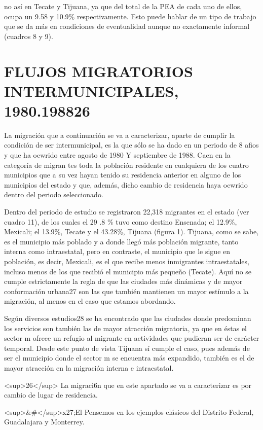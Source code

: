 \documentclass{article}
\begin{document}
no así en Tecate y Tijuana, ya que del total de la PEA de cada uno de ellos, ocupa un 9.58 y 10.9\% respectivamente. Esto puede hablar de un tipo de trabajo que se da más en condiciones de eventualidad aunque no exactamente informal (cuadros 8 y 9).

\section{FLUJOS MIGRATORIOS INTERMUNICIPALES, 1980.198826}

La migración que a continuación se va a caracterizar, aparte de cumplir la condición de ser intermunicipal, es la que sólo se ha dado en un periodo de 8 afios y que ha ocwrido entre agosto de 1980 Y septiembre de 1988. Caen en la categoría de migran tes toda la población residente en cualquiera de los cuatro municipios que a su vez hayan tenido su residencia anterior en alguno de los municipios del estado y que, además, dicho cambio de residencia haya ocwrido dentro del periodo seleccionado.

Dentro del periodo de estudio se registraron 22,318 migrantes en el estado (ver cuadro 11), de los cuales el 29 .8 \% tuvo como destino Ensenada; el 12.9\%, Mexicali; el 13.9\%, Tecate y el 43.28\%, Tijuana (figura 1). Tijuana, como se sabe, es el municipio más poblado y a donde llegó más población migrante, tanto interna como intraestatal, pero en contraste, el municipio que le sigue en población, es decir, Mexicali, es el que recibe menos inmigrantes intraestatales, incluso menos de los que recibió el municipio más pequeño (Tecate). Aquí no se cumple estrictamente la regla de que las ciudades más dinámicas y de mayor conformación urbana27 son las que también mantienen un mayor estímulo a la migración, al menos en el caso que estamos abordando.

Según diversos estudios28 se ha encontrado que las ciudades donde predominan los servicios son también las de mayor atracción migratoria, ya que en éstas el sector m ofrece un refugio al migrante en actividades que pudieran ser de carácter temporal. Desde este punto de vista Tijuana sí cumple el caso, pues además de ser el municipio donde el sector m se encuentra más expandido, también es el de mayor atracción en la migración interna e intraestatal.

<sup>26</sup> La migraci6n que en este apartado se va a caracterizar es por cambio de lugar de residencia.

<sup>\&\#</sup>x27;El Pensemos en los ejemplos clásicos del Distrito Federal, Guadalajara y Monterrey.
\end{document}
